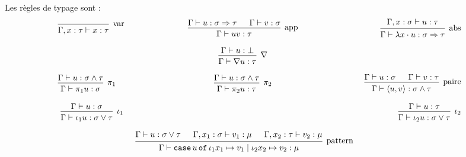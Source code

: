 \documentclass[a4paper]{article}
\theoremstyle{remark}
\theoremstyle{remark}
\theoremstyle{remark}
\theoremstyle{definition}
\theoremstyle{definition}
\theoremstyle{definition}
\begin{document}
Les règles de typage sont :
\[ \begin{array}{lcr}
\text{\begin{prooftree}
\infer0[var]{\Gamma, x : \tau \vdash x : \tau}
\end{prooftree}} &
\text{\begin{prooftree}
\hypo{\Gamma \vdash u : \sigma \Rightarrow \tau}
\hypo{\Gamma \vdash v : \sigma}
\infer2[app]{\Gamma \vdash uv : \tau}
\end{prooftree}} &
\text{\begin{prooftree}
\hypo{\Gamma, x : \sigma \vdash u : \tau}
\infer1[abs]{\Gamma \vdash \lambda x \cdot u : \sigma \Rightarrow \tau}
\end{prooftree}} \\
& & \\
&
\text{\begin{prooftree}
\hypo{\Gamma \vdash u : \bot}
\infer1[$\nabla$]{\Gamma \vdash \nabla u : \tau}
\end{prooftree}} & \\
& & \\
\text{\begin{prooftree}
\hypo{\Gamma \vdash u : \sigma \wedge \tau}
\infer1[$\pi_1$]{\Gamma \vdash \pi_1 u : \sigma}
\end{prooftree}} &
\text{\begin{prooftree}
\hypo{\Gamma \vdash u : \sigma \wedge \tau}
\infer1[$\pi_2$]{\Gamma \vdash \pi_2 u : \tau}
\end{prooftree}} &
\text{
\begin{prooftree}
\hypo{\Gamma \vdash u : \sigma}
\hypo{\Gamma \vdash v : \tau}
\infer2[paire]{\Gamma \vdash \langle u, v \rangle : \sigma \wedge \tau}
\end{prooftree}}\\
& & \\
\text{
\begin{prooftree}
\hypo{\Gamma \vdash u : \sigma}
\infer1[$\iota_1$]{\Gamma \vdash \iota_1 u : \sigma \vee \tau}
\end{prooftree}} & &
\text{
\begin{prooftree}
\hypo{\Gamma \vdash u : \tau}
\infer1[$\iota_2$]{\Gamma \vdash \iota_2 u : \sigma \vee \tau}
\end{prooftree}} \\
& & \\
&
\text{
\begin{prooftree}
\hypo{\Gamma \vdash u : \sigma \vee \tau}
\hypo{\Gamma, x_1 : \sigma \vdash v_1 : \mu}
\hypo{\Gamma, x_2 : \tau \vdash v_2 : \mu}
\infer3[pattern]{\Gamma \vdash \mathtt{case} \, u \, \mathtt{of} \, \iota_1 x_1 \mapsto v_1 \; | \; \iota_2 x_2 \mapsto v_2 : \mu}
\end{prooftree}} &
\end{array} \]
\end{document}
